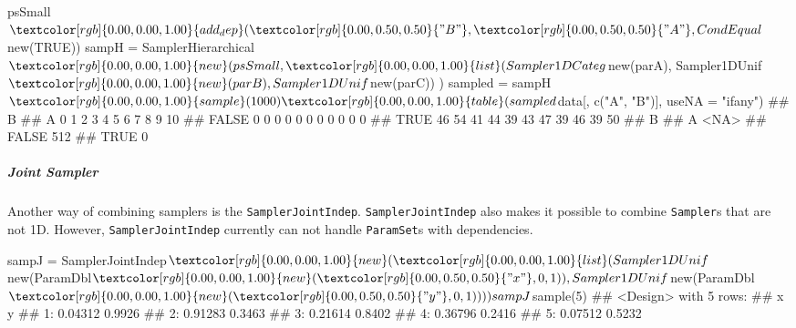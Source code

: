 \documentclass[]{article}
\newenvironment{Shaded}{}{}
\newcommand{\DataTypeTok}[1]{#1}
\newcommand{\DecValTok}[1]{#1}
\newcommand{\KeywordTok}[1]{\textcolor[rgb]{0.00,0.00,1.00}{#1}}
\newcommand{\NormalTok}[1]{#1}
\newcommand{\OperatorTok}[1]{#1}
\newcommand{\OtherTok}[1]{\textcolor[rgb]{1.00,0.25,0.00}{#1}}
\newcommand{\StringTok}[1]{\textcolor[rgb]{0.00,0.50,0.50}{#1}}
\let\oldsubparagraph\subparagraph
\renewcommand{\subparagraph}[1]{\oldsubparagraph{#1}\mbox{}}
\renewenvironment{Shaded} {\begin{snugshade}\small} {\end{snugshade}}
\begin{document}
\begin{Shaded}
\begin{Highlighting}[]
\NormalTok{psSmall}\OperatorTok{$}\KeywordTok{add_dep}\NormalTok{(}\StringTok{"B"}\NormalTok{, }\StringTok{"A"}\NormalTok{, CondEqual}\OperatorTok{$}\KeywordTok{new}\NormalTok{(}\OtherTok{TRUE}\NormalTok{))}
\NormalTok{sampH =}\StringTok{ }\NormalTok{SamplerHierarchical}\OperatorTok{$}\KeywordTok{new}\NormalTok{(psSmall,}
  \KeywordTok{list}\NormalTok{(Sampler1DCateg}\OperatorTok{$}\KeywordTok{new}\NormalTok{(parA),}
\NormalTok{    Sampler1DUnif}\OperatorTok{$}\KeywordTok{new}\NormalTok{(parB),}
\NormalTok{    Sampler1DUnif}\OperatorTok{$}\KeywordTok{new}\NormalTok{(parC))}
\NormalTok{)}
\NormalTok{sampled =}\StringTok{ }\NormalTok{sampH}\OperatorTok{$}\KeywordTok{sample}\NormalTok{(}\DecValTok{1000}\NormalTok{)}
\KeywordTok{table}\NormalTok{(sampled}\OperatorTok{$}\NormalTok{data[, }\KeywordTok{c}\NormalTok{(}\StringTok{"A"}\NormalTok{, }\StringTok{"B"}\NormalTok{)], }\DataTypeTok{useNA =} \StringTok{"ifany"}\NormalTok{)}
\NormalTok{##        B}
\NormalTok{## A         0   1   2   3   4   5   6   7   8   9  10}
\NormalTok{##   FALSE   0   0   0   0   0   0   0   0   0   0   0}
\NormalTok{##   TRUE   46  54  41  44  39  43  47  39  46  39  50}
\NormalTok{##        B}
\NormalTok{## A       <NA>}
\NormalTok{##   FALSE  512}
\NormalTok{##   TRUE     0}
\end{Highlighting}
\end{Shaded}

\hypertarget{joint-sampler}{%
\subparagraph{Joint Sampler}\label{joint-sampler}}

Another way of combining samplers is the \texttt{SamplerJointIndep}.
\texttt{SamplerJointIndep} also makes it possible to combine \texttt{Sampler}s that are not 1D.
However, \texttt{SamplerJointIndep} currently can not handle \texttt{ParamSet}s with dependencies.

\begin{Shaded}
\begin{Highlighting}[]
\NormalTok{sampJ =}\StringTok{ }\NormalTok{SamplerJointIndep}\OperatorTok{$}\KeywordTok{new}\NormalTok{(}
  \KeywordTok{list}\NormalTok{(Sampler1DUnif}\OperatorTok{$}\KeywordTok{new}\NormalTok{(ParamDbl}\OperatorTok{$}\KeywordTok{new}\NormalTok{(}\StringTok{"x"}\NormalTok{, }\DecValTok{0}\NormalTok{, }\DecValTok{1}\NormalTok{)),}
\NormalTok{    Sampler1DUnif}\OperatorTok{$}\KeywordTok{new}\NormalTok{(ParamDbl}\OperatorTok{$}\KeywordTok{new}\NormalTok{(}\StringTok{"y"}\NormalTok{, }\DecValTok{0}\NormalTok{, }\DecValTok{1}\NormalTok{)))}
\NormalTok{)}
\NormalTok{sampJ}\OperatorTok{$}\KeywordTok{sample}\NormalTok{(}\DecValTok{5}\NormalTok{)}
\NormalTok{## <Design> with 5 rows:}
\NormalTok{##          x      y}
\NormalTok{## 1: 0.04312 0.9926}
\NormalTok{## 2: 0.91283 0.3463}
\NormalTok{## 3: 0.21614 0.8402}
\NormalTok{## 4: 0.36796 0.2416}
\NormalTok{## 5: 0.07512 0.5232}
\end{Highlighting}
\end{Shaded}
\end{document}
